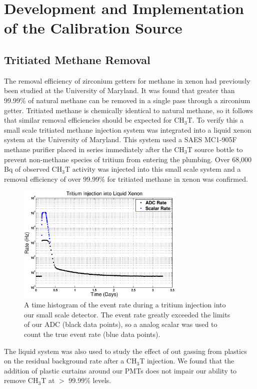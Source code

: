 \section{Development and Implementation of the Calibration Source}

\subsection{Tritiated Methane Removal}
\label{sec:RD}

The removal efficiency of zirconium getters for methane in xenon had previously been studied at the University of Maryland.  It was found that greater than 99.99\% of natural methane can be removed in a single pass through a zirconium getter. \cite{Dobi} Tritiated methane is chemically identical to natural methane, so it follows that similar removal efficiencies should be expected for CH$_3$T.  To verify this a small scale tritiated methane injection system was integrated into a liquid xenon system at the University of Maryland.  This system used a SAES MC1-905F methane purifier placed in series immediately after the CH$_3$T source bottle to prevent non-methane species of tritium from entering the plumbing. Over 68,000 Bq of observed CH$_3$T activity was injected into this small scale system and a removal efficiency of over 99.99\% for tritiated methane in xenon was confirmed.

\begin{figure}[h!]\centering
\includegraphics[width=80mm]{TimeHisto_Analog2.eps}
\caption{A time histogram of the event rate during a tritium injection into our small scale detector. The event rate greatly exceeded the limits of our ADC (black data points), so a analog scalar was used to count the true event rate (blue data points). }
\label{fig:Density}
\end{figure}


The liquid system was also used to study the effect of out gassing from plastics on the residual background rate after a CH$_3$T injection.  We found that the addition of plastic curtains around our PMTs does not impair our ability to remove CH$_3$T at $>$ 99.99\% levels. 

